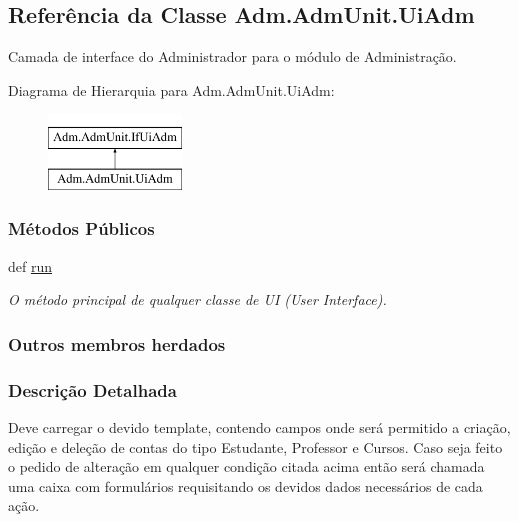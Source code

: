 \hypertarget{classAdm_1_1AdmUnit_1_1UiAdm}{}\subsection{Referência da Classe Adm.\+Adm\+Unit.\+Ui\+Adm}
\label{classAdm_1_1AdmUnit_1_1UiAdm}


Camada de interface do Administrador para o módulo de Administração.  


Diagrama de Hierarquia para Adm.\+Adm\+Unit.\+Ui\+Adm\+:\begin{figure}[H]
\begin{center}
\leavevmode
\includegraphics[height=2.000000cm]{d4/dde/classAdm_1_1AdmUnit_1_1UiAdm}
\end{center}
\end{figure}
\subsubsection*{Métodos Públicos}
\begin{DoxyCompactItemize}
\item 
def \hyperlink{classAdm_1_1AdmUnit_1_1UiAdm_a88df3b19b48d71b2c0fc0b4557c71416}{run}
\begin{DoxyCompactList}\small\item\em O método principal de qualquer classe de U\+I (User Interface). \end{DoxyCompactList}\end{DoxyCompactItemize}
\subsubsection*{Outros membros herdados}


\subsubsection{Descrição Detalhada}
Deve carregar o devido template, contendo campos onde será permitido a criação, edição e deleção de contas do tipo Estudante, Professor e Cursos. Caso seja feito o pedido de alteração em qualquer condição citada acima então será chamada uma caixa com formulários requisitando os devidos dados necessários de cada ação. 

